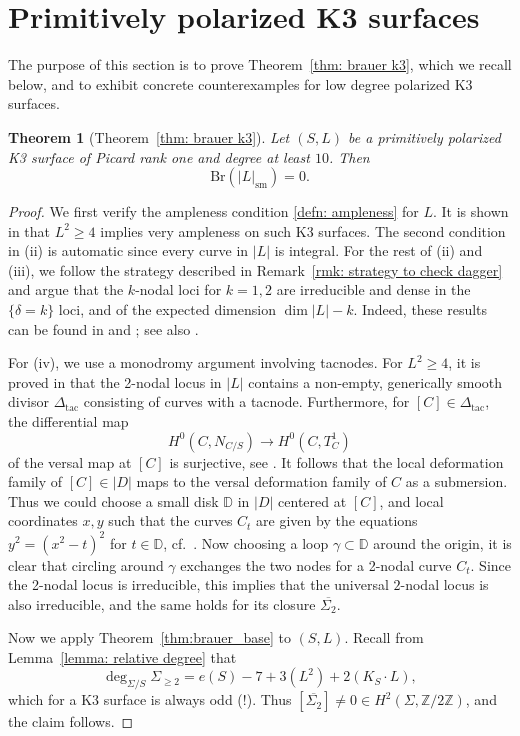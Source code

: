 \documentclass[11pt]{amsart}
\theoremstyle{plain}
\newtheorem{thm}{Theorem}[section]
\theoremstyle{definition}
\theoremstyle{remark}
\begin{document}
\section{Primitively polarized K3 surfaces}\label{sec: K3}

The purpose of this section is to prove Theorem~\ref{thm: brauer k3}, which we recall below, and to exhibit concrete counterexamples for low degree polarized K3 surfaces.

\begin{thm}[Theorem~\ref{thm: brauer k3}]
    Let $(S, L)$ be a primitively polarized K3 surface of Picard rank one and degree at least $10$. Then
    \[
    \mathrm{Br}(|L|_\mathrm{sm}) = 0.
    \]
\end{thm}

\begin{proof}
    We first verify the ampleness condition \ref{defn: ampleness} for $L$. It is shown in \cite{Knutsen} that $L^2 \geq 4$ implies very ampleness on such K3 surfaces. The second condition in (ii) is automatic since every curve in $|L|$ is integral. For the rest of (ii) and (iii), we follow the strategy described in Remark~\ref{rmk: strategy to check dagger} and argue that the $k$-nodal loci for $k=1, 2$ are irreducible and dense in the $\{\delta = k\}$ loci, and of the expected dimension $\dim |L| - k$. Indeed, these results can be found in \cite[Section~4]{Dedieu-Sernesi} and \cite[Theorem~1.2]{Bruno-Lelli-Chiesa}; see also \cite[Section~2]{Ciliberto-Dedieu}. 
    
    For (iv), we use a monodromy argument involving tacnodes. For $L^2 \geq 4$, it is proved in \cite[Corollary~4.2]{Galati-Knutsen} that the 2-nodal locus in $|L|$ contains a non-empty, generically smooth divisor $\Delta_{\mathrm{tac}}$ consisting of curves with a tacnode. Furthermore, for $[C]\in \Delta_{\mathrm{tac}}$, the differential map 
    \[
    H^0(C, N_{C/S}) \to H^0(C, T_C^1)
    \]
    of the versal map at $[C]$ is surjective, see \cite[Theorem~1.1]{Galati-Knutsen}. It follows that the local deformation family of $[C]\in |D|$ maps to the versal deformation family of $C$ as a submersion. Thus we could choose a small disk $\mathbb D$ in $|D|$ centered at $[C]$, and local coordinates $x, y$ such that the curves $C_t$ are given by the equations $y^2=(x^2-t)^2$ for $t\in \mathbb D$, cf.~\cite[Section~2.4.1]{Caporaso-Harris}. Now choosing a loop $\gamma \subset \mathbb D$ around the origin, it is clear that circling around $\gamma$ exchanges the two nodes for a 2-nodal curve $C_t$. Since the 2-nodal locus is irreducible, this implies that the universal $2$-nodal locus is also irreducible, and the same holds for its closure $\overline{\Sigma_2}$. %
    
    Now we apply Theorem~\ref{thm:brauer_base} to $(S,L)$. Recall from Lemma~\ref{lemma: relative degree} that
    \[
    \deg_{\Sigma/S} \Sigma_{\geq 2} = e(S) - 7 + 3 (L^2) + 2 (K_S \cdot L),
    \]
    which for a K3 surface is always odd (!). Thus $[\overline{\Sigma_{2}}]\neq 0 \in H^2(\Sigma, \mathbb Z/ 2\mathbb Z)$, and the claim follows.
\end{proof}
\end{document}
